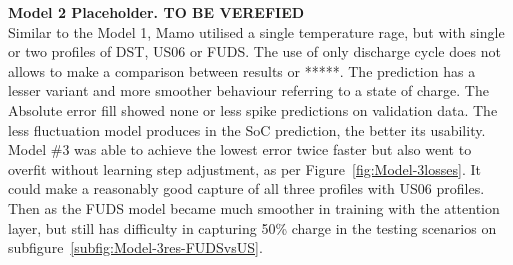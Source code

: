 %
%
\textbf{Model 2 Placeholder. TO BE VEREFIED} \\ 

%
%
Similar to the Model 1, Mamo utilised a single temperature rage, but with single or two profiles of DST, US06 or FUDS.
The use of only discharge cycle does not allows to make a comparison between results or *****.
The prediction has a lesser variant and more smoother behaviour referring to a state of charge. 
The Absolute error fill showed none or less spike predictions on validation data.
The less fluctuation model produces in the SoC prediction, the better its usability.
Model \#3 was able to achieve the lowest error twice faster but also went to overfit without learning step adjustment, as per Figure~\ref{fig:Model-3losses}.
It could make a reasonably good capture of all three profiles with US06 profiles.
Then as the FUDS model became much smoother in training with the attention layer, but still has difficulty in capturing 50\% charge in the testing scenarios on subfigure~\ref{subfig:Model-3res-FUDSvsUS}. 

